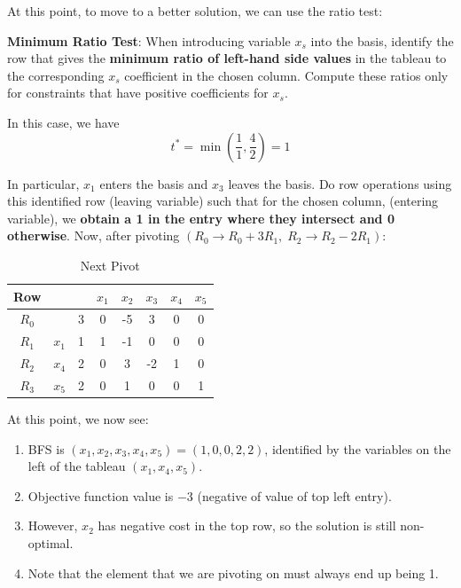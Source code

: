 \documentclass{article}
\begin{document}
\noindent At this point, to move to a better solution, we can use the ratio test: 

\begin{theorem}
    \textbf{Minimum Ratio Test}: When introducing variable $x_s$ into the basis, identify the row that gives the \textbf{minimum ratio of left-hand side values} in the tableau to the corresponding $x_s$ coefficient in the chosen column. Compute these ratios only for constraints that have positive coefficients for $x_s$. 
\end{theorem}

\noindent In this case, we have \begin{equation*}
    t^{*} = \min \left(\frac{1}{1}, \frac{4}{2}\right) = 1
\end{equation*}

\noindent In particular, $x_{1}$ enters the basis and $x_{3}$ leaves the basis. Do row operations using this identified row (leaving variable) such that for the chosen column, (entering variable), we \textbf{obtain a 1 in the entry where they intersect and 0 otherwise}. Now, after pivoting $(R_{0} \to R_{0}  + 3 R_{1}, \; R_{2} \to  R_{2} - 2 R_{1})$:


\begin{table}[H]
    \centering
    \begin{tabular}{c | c c | c c c c c}
        Row & & & $x_{1}$ & $x_{2}$ & $x_{3}$ & $x_{4}$ & $x_{5}$ \\ \hline 
        $R_{0}$ & & 3 & 0 & -5 & 3 & 0 & 0 \\ \hline 
        $R_{1}$ & $x_{1}$ & 1 & 1 & -1 & 0 & 0 & 0 \\ 
        $R_{2}$ & $x_{4}$ & 2 & 0 & 3 & -2 & 1 & 0 \\ 
        $R_{3}$ & $x_{5}$ & 2 & 0 & 1 & 0 & 0 & 1
    \end{tabular}
    \caption{Next Pivot}
    \label{tab: 2-tableaupivoted2}
\end{table} 

\noindent At this point, we now see: \begin{enumerate}
    \item BFS is $(x_{1}, x_{2}, x_{3}, x_{4}, x_{5}) = (1,0,0,2,2)$, identified by the variables on the left of the tableau $(x_{1}, x_{4}, x_{5})$. 
    \item Objective function value is $-3$ (negative of value of top left entry). 
    \item However, $x_{2}$ has negative cost in the top row, so the solution is still non-optimal.
    \item Note that the element that we are pivoting on must always end up being 1.
\end{enumerate}
\end{document}
